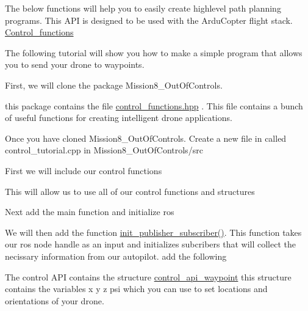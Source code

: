 The below functions will help you to easily create highlevel path planning programs. This A\+PI is designed to be used with the Ardu\+Copter flight stack. \mbox{\hyperlink{group__control__functions}{Control\+\_\+functions}}

The following tutorial will show you how to make a simple program that allows you to send your drone to waypoints.

First, we will clone the package Mission8\+\_\+\+Out\+Of\+Controls. 
\begin{DoxyCode}{0}
\end{DoxyCode}


this package contains the file \mbox{\hyperlink{control__functions_8hpp}{control\+\_\+functions.\+hpp}} . This file contains a bunch of useful functions for creating intelligent drone applications.

Once you have cloned Mission8\+\_\+\+Out\+Of\+Controls. Create a new file in called {\ttfamily control\+\_\+tutorial.\+cpp} in {\ttfamily Mission8\+\_\+\+Out\+Of\+Controls/src}

First we will include our control functions 
\begin{DoxyCode}{0}
\end{DoxyCode}
 This will allow us to use all of our control functions and structures

Next add the main function and initialize ros 
\begin{DoxyCode}{0}
\DoxyCodeLine{\{}
\DoxyCodeLine{}
\DoxyCodeLine{}
\DoxyCodeLine{}
\DoxyCodeLine{}
\DoxyCodeLine{\}}
\end{DoxyCode}


We will then add the function \mbox{\hyperlink{group__control__functions_gae693b071b5392f9253cdfc1f4f362fcc}{init\+\_\+publisher\+\_\+subscriber()}}. This function takes our ros node handle as an input and initializes subcribers that will collect the necissary information from our autopilot. add the following


\begin{DoxyCode}{0}
\end{DoxyCode}
 The control A\+PI contains the structure {\ttfamily \mbox{\hyperlink{structcontrol__api__waypoint}{control\+\_\+api\+\_\+waypoint}}} this structure contains the variables {\ttfamily x y z psi} which you can use to set locations and orientations of your drone.

